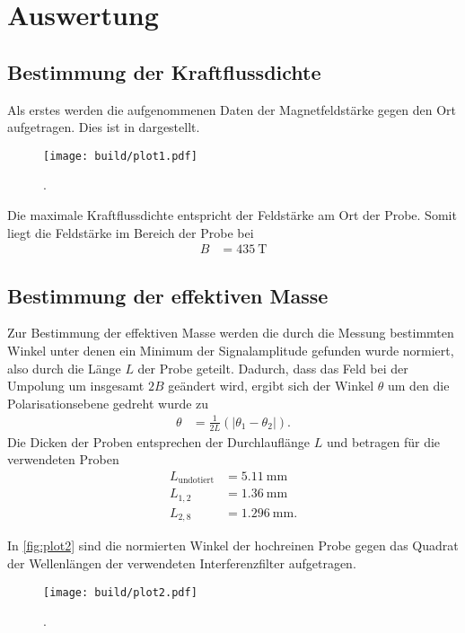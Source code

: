 \section{Auswertung}
\label{sec:Auswertung}


\subsection{Bestimmung der Kraftflussdichte}
\label{sub:Kraftflussdichte}

Als erstes werden die aufgenommenen Daten der Magnetfeldstärke gegen den Ort aufgetragen.
Dies ist in
dargestellt.
\begin{figure}[H]
  \centering
  \texttt{[image: build/plot1.pdf]}
  \caption {.}
  \label{fig:plot1}
\end{figure}


Die maximale Kraftflussdichte entspricht der Feldstärke am Ort der Probe.
Somit liegt die Feldstärke im Bereich der Probe bei 
\begin{align*}
  B &= \qty{435}{\tesla}
\end{align*}

\subsection{Bestimmung der effektiven Masse}
\label{sub:effektiveMasse}

Zur Bestimmung der effektiven Masse werden die durch die Messung bestimmten Winkel unter denen ein Minimum der Signalamplitude gefunden wurde
normiert, also durch die Länge $L$ der Probe geteilt.
Dadurch, dass das Feld bei der Umpolung um insgesamt $\num{2}B$ geändert wird, ergibt sich der Winkel $\theta$ um den die Polarisationsebene
gedreht wurde zu
\begin{align}
  \theta &= \frac{1}{2L}(\lvert \theta_1-\theta_2 \rvert).
\end{align}
Die Dicken der Proben entsprechen der Durchlauflänge $L$ und betragen für die verwendeten Proben
\begin{align*}
  L_{\text{undotiert}}&= \qty{5.11}{\milli\meter}\\
  L_{1,2}&= \qty{1.36}{\milli\meter}\\
  L_{2,8}&= \qty{1.296}{\milli\meter}.
\end{align*}

In \autoref{fig:plot2} sind die normierten Winkel der hochreinen Probe gegen das Quadrat der Wellenlängen der verwendeten Interferenzfilter aufgetragen.
\begin{figure}[H]
  \centering
  \texttt{[image: build/plot2.pdf]}
  \caption {.}
  \label{fig:plot2}
\end{figure}


